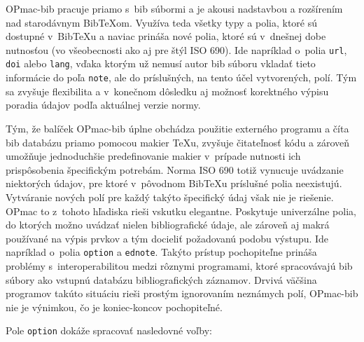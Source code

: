 \documentclass{fithesis3}
\begin{document}
	OPmac-bib pracuje priamo s~bib súbormi a je akousi nadstavbou a rozšírením nad starodávnym Bib\TeX om. Využíva teda všetky typy a polia, ktoré sú dostupné v~Bib\TeX u a naviac prináša nové polia, ktoré sú v~dnešnej dobe nutnosťou (vo všeobecnosti ako aj pre štýl ISO 690). Ide napríklad o~polia \texttt{url}, \texttt{doi} alebo \texttt{lang}, vďaka ktorým už nemusí autor bib súboru vkladať tieto informácie do poľa \texttt{note}, ale do príslušných, na tento účel vytvorených, polí. Tým sa zvyšuje flexibilita a v~konečnom dôsledku aj možnosť korektného výpisu poradia údajov podľa aktuálnej verzie normy.

	Tým, že balíček OPmac-bib úplne obchádza použitie externého programu a číta bib databázu priamo pomocou makier \TeX u, zvyšuje čitateľnosť kódu a zároveň umožňuje jednoduchšie predefinovanie makier v~prípade nutnosti ich prispôsobenia špecifickým potrebám. Norma ISO 690 totiž vynucuje uvádzanie niektorých údajov, pre ktoré v~pôvodnom Bib\TeX u príslušné polia neexistujú. Vytváranie nových polí pre každý takýto špecifický údaj však nie je riešenie. OPmac to z~tohoto hľadiska rieši vskutku elegantne. Poskytuje univerzálne polia, do ktorých možno uvádzať nielen bibliografické údaje, ale zároveň aj makrá používané na výpis prvkov a tým docieliť požadovanú podobu výstupu. Ide napríklad o~polia \texttt{option} a \texttt{ednote}. Takýto prístup pochopiteľne prináša problémy s~interoperabilitou medzi rôznymi programami, ktoré spracovávajú bib súbory ako vstupnú databázu bibliografických záznamov. Drvivá väčšina programov takúto situáciu rieši prostým ignorovaním neznámych polí, OPmac-bib nie je výnimkou, čo je koniec-koncov pochopiteľné.

	Pole \texttt{option} dokáže spracovať nasledovné voľby:
\end{document}
